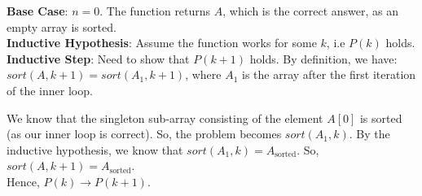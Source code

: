 \documentclass[a4paper]{article}
\begin{document}
\begin{enumerate}
\begin{enumerate}[label=\roman*]
\textbf{Base Case}: $n = 0$. The function returns $A$, which is the correct answer, as an empty array is sorted. \\

\textbf{Inductive Hypothesis}: Assume the function works for some $k$, i.e $P(k)$ holds.\\

\textbf{Inductive Step}: Need to show that $P(k+1)$ holds. By definition, we have:\\

$sort(A, k+1) = sort(A_1, k+1)$, where $A_1$ is the array after the first iteration of the inner loop.

We know that the singleton sub-array consisting of the element $A[0]$ is sorted (as our inner loop is correct). So, the problem becomes $sort(A_1, k)$. By the inductive hypothesis, we know that $sort(A_1, k) = A_{\text{sorted}}$. So, $sort(A, k+1) = A_{\text{sorted}}$.\\

Hence, $P(k) \rightarrow P(k+1)$.\\
\end{enumerate}
\end{enumerate}
\end{document}
